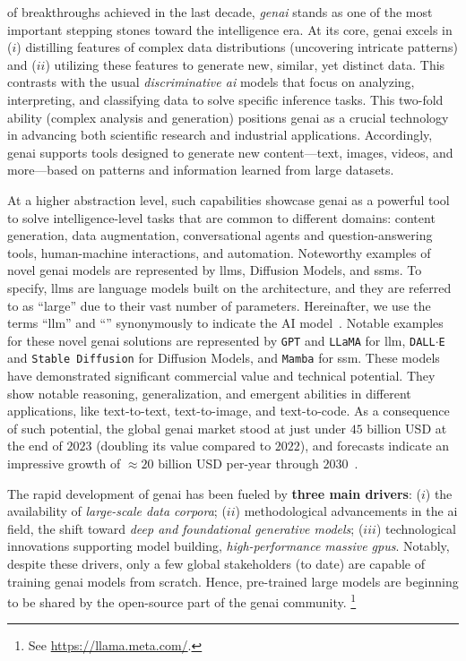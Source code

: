 

 of breakthroughs achieved in the last decade, \emph{\gls{genai}} stands as one of the most important stepping stones toward the intelligence era.
At its core, \gls{genai} excels in ($i$) distilling features of complex data distributions (uncovering intricate patterns) and ($ii$) utilizing these features to generate new, similar, yet distinct data.
This contrasts with the usual \emph{discriminative \gls{ai}} models that focus
on analyzing, interpreting, and classifying data to solve specific inference tasks.
This two-fold ability (\ie complex analysis and generation) positions \gls{genai} as a crucial technology in advancing both scientific research and industrial applications.
Accordingly, \gls{genai} supports tools designed to generate new content---text, images, videos, and more---based on patterns and information learned from large datasets. 

At a higher abstraction level, such capabilities showcase \gls{genai} as a powerful tool to solve intelligence-level tasks that are common to different domains: content generation, data augmentation,  conversational agents and question-answering tools, human-machine interactions, and automation.
%
Noteworthy examples of novel \gls{genai} models are represented by \glspl{llm}, Diffusion Models, and \glspl{ssm}.
To specify, \glspl{llm} are language models built on the  architecture, and they are referred to as ``large'' due to their vast number of parameters.
Hereinafter, we use the terms ``\gls{llm}'' and ``'' synonymously to indicate the AI model~\cite{yang2024harnessing}.
Notable examples for these novel \gls{genai} solutions are represented by \texttt{GPT} and \texttt{LLaMA} for \gls{llm}, \texttt{DALL$\cdot$E} and \texttt{Stable Diffusion} for Diffusion Models, and \texttt{Mamba} for \gls{ssm}.
These models
have demonstrated significant commercial value and technical potential. 
They 
show notable reasoning, generalization, and emergent abilities in different applications, like text-to-text, text-to-image, and text-to-code.
%
As a consequence of such potential, the global \gls{genai} market stood at just under $45$ billion USD at the end of $2023$ (doubling its value compared to $2022$), and forecasts indicate an impressive growth of $\approx 20$ billion USD per-year through $2030$~\cite{statista1}.


The rapid development of \gls{genai} has been fueled by \textbf{three main drivers}: 
($i$) the availability of \emph{large-scale data corpora}; 
($ii$) methodological advancements in the \gls{ai} field, \ie the shift toward \emph{deep and foundational generative models}; 
($iii$) technological innovations supporting model building, \ie \emph{high-performance massive \glspl{gpu}}.
Notably, despite these drivers, only a few global stakeholders (to date) are capable of training \gls{genai} models from scratch. 
Hence, pre-trained large models are beginning to be shared by the open-source part of the \gls{genai} community.%
\footnote{See \eg \url{https://llama.meta.com/}.}

